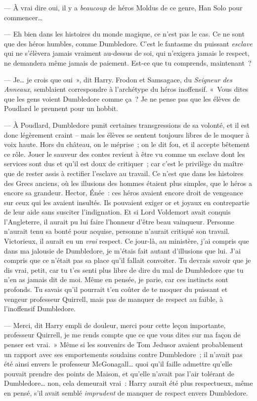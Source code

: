 --- À vrai dire oui, il y a \emph{beaucoup} de héros Moldus de ce genre, Han Solo pour commencer…

--- Eh bien dans les histoires du monde magique, ce n'est pas le cas. Ce ne sont que des héros humbles, comme Dumbledore. C'est le fantasme du puissant \emph{esclave} qui ne s'élèvera jamais vraiment au-dessus de soi, qui n'exigera jamais le respect, ne demandera même jamais de paiement. Est-ce que tu comprends, maintenant~?

--- Je… je crois que oui~», dit Harry. Frodon et Samsagace, du \emph{Seigneur des Anneaux}, semblaient correspondre à l'archétype du héros inoffensif. «~Vous dites que les gens voient Dumbledore comme ça~? Je ne pense pas que les élèves de Poudlard le prennent pour un hobbit.

--- À Poudlard, Dumbledore punit certaines transgressions de sa volonté, et il est donc légèrement craint -- mais les élèves se sentent toujours libres de le moquer à voix haute. Hors du château, on le méprise~; on le dit fou, et il accepte bêtement ce rôle. Jouer le sauveur des contes revient à être vu comme un esclave dont les services sont dus et qu'il est doux de critiquer~; car c'est le privilège du maître que de rester assis à rectifier l'esclave au travail. Ce n'est que dans les histoires des Grecs anciens, où les illusions des hommes étaient plus simples, que le héros a encore sa grandeur. Hector, Énée~: ces héros avaient encore droit de vengeance sur ceux qui les avaient insultés. Ils pouvaient exiger or et joyaux en contrepartie de leur aide sans susciter l'indignation. Et si Lord Voldemort avait conquis l'Angleterre, il aurait pu lui faire l'honneur d'être beau vainqueur. Personne n'aurait tenu sa bonté pour acquise, personne n'aurait critiqué son travail. Victorieux, il aurait eu un \emph{vrai} respect. Ce jour-là, au ministère, j'ai compris que dans ma jalousie de Dumbledore, je m'étais fait autant d'illusions que lui. J'ai compris que ce n'était pas sa place qu'il fallait convoiter. Tu devrais savoir que je dis vrai, petit, car tu t'es senti plus libre de dire du mal de Dumbledore que tu n'en as jamais dit de moi. Même en pensée, je parie, car ces instincts sont profonds. Tu savais qu'il pourrait t'en coûter de te moquer du puissant et vengeur professeur Quirrell, mais pas de manquer de respect au faible, à l'inoffensif Dumbledore.

--- Merci, dit Harry empli de douleur, merci pour cette leçon importante, professeur Quirrell, je me rends compte que ce que vous dites sur ma façon de penser est vrai.~» Même si les souvenirs de Tom Jedusor avaient probablement un rapport avec ses emportements soudains contre Dumbledore~; il n'avait pas été ainsi envers le professeur McGonagall… quoi qu'il faille admettre qu'elle pouvait prendre des points de Maison, et qu'elle n'avait pas l'air tolérant de Dumbledore… non, cela demeurait vrai~: Harry aurait été plus respectueux, même en pensé, s'il avait semblé \emph{imprudent} de manquer de respect envers Dumbledore.

